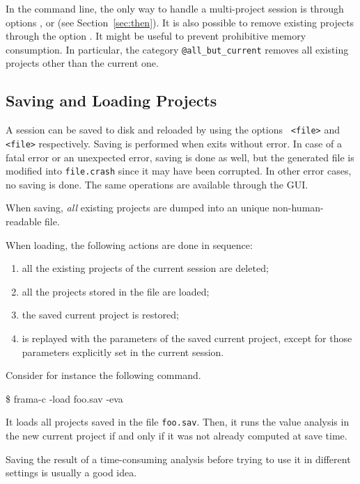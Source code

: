 In the command line, the only way to handle a multi-project session is through
options ,  or
 (see Section~\ref{sec:then}). It is also possible to
remove existing projects through the option . It
might be useful to prevent prohibitive memory consumption. In particular, the
category \texttt{@all\_but\_current} removes all existing projects other than
the current one.

\subsection{Saving and Loading Projects}\label{sec:saveload}

A session can be saved to disk and reloaded by using the options
\texttt{ <file>} and \texttt{ <file>}
respectively. Saving is performed when \FramaC exits without error. In case of a
fatal error or an unexpected error, saving is done as well, but the generated
file is modified into \texttt{file.crash} since it may have been corrupted. In
other error cases, no saving is done. The same operations are available
through the GUI.

When saving, \emph{all} existing projects are dumped into an unique
non-human-readable file.

When loading, the following actions are done in sequence:
\begin{enumerate}
\item all the existing projects of the current session are deleted;
\item all the projects stored in the file are loaded;
\item the saved current project is restored;
\item \FramaC is replayed with the parameters of the saved current project,
  except for those parameters explicitly set in the current session.
\end{enumerate}

Consider for instance the following command.
\begin{frama-c-commands}
\$ frama-c -load foo.sav -eva
\end{frama-c-commands}
It loads all projects saved in the file \texttt{foo.sav}. Then, it runs the
value analysis in the new current project if and only if it was not already
computed at save time.

\begin{convention}
Saving the result of a time-consuming analysis before trying to use it in
different settings is usually a good idea.
\end{convention}

